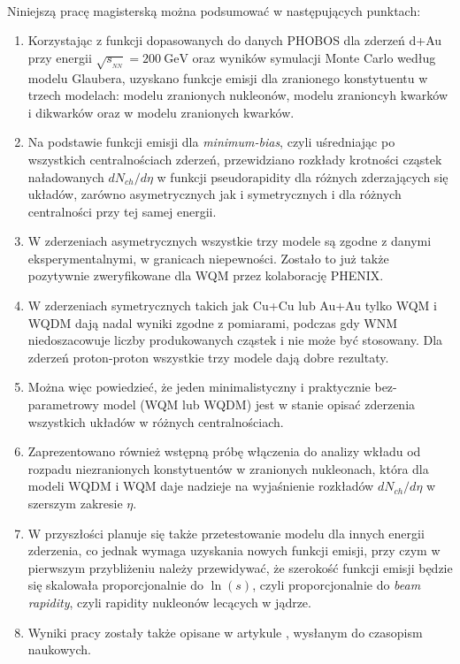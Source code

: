 \documentclass[a4paper,12pt]{article}
\begin{document}
\paragraph{}
Niniejszą pracę magisterską można podsumować w następujących punktach:
\begin{enumerate}[label=(\roman*)]
	\item Korzystając z funkcji dopasowanych do danych PHOBOS dla zderzeń d+Au przy energii $\sqrt{s_{_{NN}}} = 200~\text{GeV}$ oraz wyników symulacji Monte Carlo według modelu Glaubera, uzyskano funkcje emisji dla zranionego konstytuentu w trzech modelach: modelu zranionych nukleonów, modelu zranioncyh kwarków i dikwarków oraz w modelu zranionych kwarków.
	\item Na podstawie funkcji emisji dla \textit{minimum-bias}, czyli uśredniając po wszystkich centralnościach zderzeń, przewidziano rozkłady krotności cząstek naładowanych $dN_{ch}/d\eta$ w funkcji pseudorapidity dla różnych zderzających się układów, zarówno asymetrycznych jak i symetrycznych i dla różnych centralności przy tej samej energii.
	\item W zderzeniach asymetrycznych wszystkie trzy modele są zgodne z danymi eksperymentalnymi, w granicach niepewności. Zostało to już także pozytywnie zweryfikowane dla WQM przez kolaborację PHENIX. 
	\item W zderzeniach symetrycznych takich jak Cu+Cu lub Au+Au tylko WQM i WQDM dają nadal wyniki zgodne z pomiarami, podczas gdy WNM niedoszacowuje liczby produkowanych cząstek i nie może być stosowany. Dla zderzeń proton-proton wszystkie trzy modele dają dobre rezultaty.
	\item Można więc powiedzieć, że jeden minimalistyczny i praktycznie bez-parametrowy model (WQM lub WQDM) jest w stanie opisać zderzenia wszystkich układów w różnych centralnościach.
	\item Zaprezentowano również wstępną próbę włączenia do analizy wkładu od rozpadu niezranionych konstytuentów w zranionych nukleonach, która dla modeli WQDM i WQM daje nadzieje na wyjaśnienie rozkładów $dN_{ch}/d\eta$ w szerszym zakresie $\eta$.
	\item W przyszłości planuje się także przetestowanie modelu dla innych energii zderzenia, co jednak wymaga uzyskania nowych funkcji emisji, przy czym w pierwszym przybliżeniu należy przewidywać, że szerokość funkcji emisji  będzie się skalowała proporcjonalnie do $\ln(s)$, czyli proporcjonalnie do \textit{beam rapidity}, czyli rapidity nukleonów lecących w jądrze.
	\item Wyniki pracy zostały także opisane w artykule \cite{Barej:2019xef}, wysłanym do czasopism naukowych.
\end{enumerate}
\end{document}
